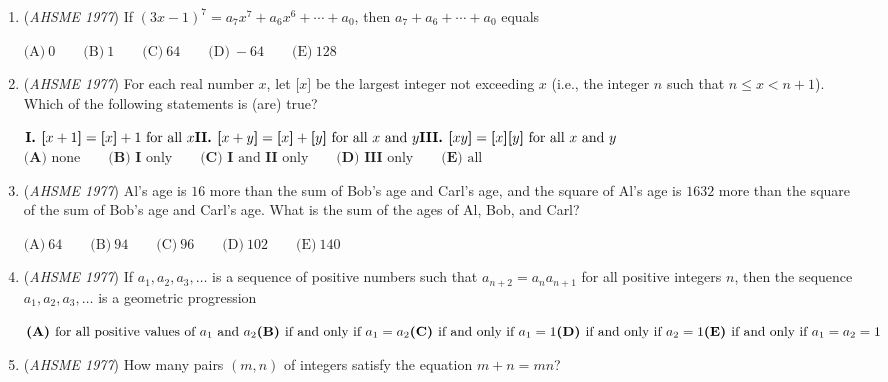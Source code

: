 \begin{enumerate}
	\item (\textit{AHSME 1977}) If $(3x-1)^7 = a_7x^7 + a_6x^6 + \cdots + a_0$, then $a_7 + a_6 + \cdots + a_0$ equals 


 $\text{(A)}\ 0 \qquad  \text{(B)}\ 1 \qquad  \text{(C)}\ 64 \qquad  \text{(D)}\ -64 \qquad  \text{(E)}\ 128$


	\item (\textit{AHSME 1977}) For each real number $x$, let $\textbf{[}x\textbf{]}$ be the largest integer not exceeding $x$ 
(i.e., the integer $n$ such that $n\le x<n+1$). Which of the following statements is (are) true?


 $\textbf{I. [}x+1\textbf{]}=\textbf{[}x\textbf{]}+1\text{ for all }x \\ \textbf{II. [}x+y\textbf{]}=\textbf{[}x\textbf{]}+\textbf{[}y\textbf{]}\text{ for all }x\text{ and }y \\ \textbf{III. [}xy\textbf{]}=\textbf{[}x\textbf{]}\textbf{[}y\textbf{]}\text{ for all }x\text{ and }y$
$\textbf{(A) }\text{none}\qquad \textbf{(B) }\textbf{I }\text{only}\qquad \textbf{(C) }\textbf{I}\text{ and }\textbf{II}\text{ only}\qquad \textbf{(D) }\textbf{III }\text{only}\qquad \textbf{(E) }\text{all}$


	\item (\textit{AHSME 1977}) Al's age is $16$ more than the sum of Bob's age and Carl's age, and the square of Al's age is $1632$ more than the square of the sum of 
Bob's age and Carl's age. What is the sum of the ages of Al, Bob, and Carl?     


 $\text{(A)}\ 64 \qquad  \text{(B)}\ 94 \qquad  \text{(C)}\ 96 \qquad  \text{(D)}\ 102 \qquad  \text{(E)}\ 140$


	\item (\textit{AHSME 1977}) If $a_1,a_2,a_3,\dots$ is a sequence of positive numbers such that $a_{n+2}=a_na_{n+1}$ for all positive integers $n$, 
then the sequence $a_1,a_2,a_3,\dots$ is a geometric progression


 $\textbf{(A) }\text{for all positive values of }a_1\text{ and }a_2\qquad\\ \textbf{(B) }\text{if and only if }a_1=a_2\qquad\\ \textbf{(C) }\text{if and only if }a_1=1\qquad\\ \textbf{(D) }\text{if and only if }a_2=1\qquad\\ \textbf{(E) }\text{if and only if }a_1=a_2=1$


	\item (\textit{AHSME 1977}) How many pairs $(m,n)$ of integers satisfy the equation $m+n=mn$?



\end{enumerate}
